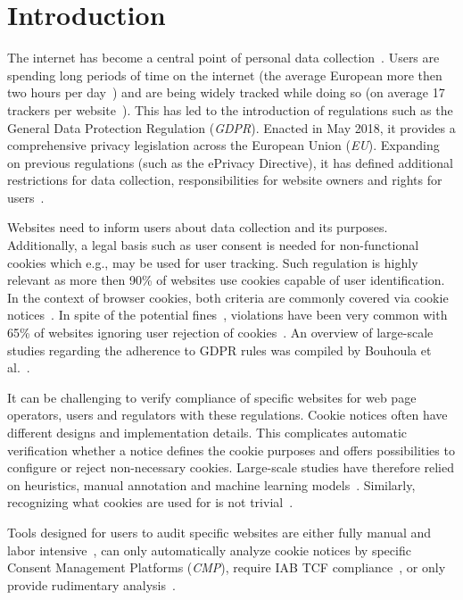 \chapter{Introduction} \label{chap:introduction}

The internet has become a central point of personal data collection~\cite{kretschmer2021cookie}.
Users are spending long periods of time on the internet (the average European more then two hours per day~\cite{kretschmer2021cookie}) and are being widely tracked while doing so (on average 17 trackers per website~\cite{kretschmer2021cookie}).
This has led to the introduction of regulations such as the General Data Protection Regulation (\emph{GDPR}). 
Enacted in May 2018, it provides a comprehensive privacy legislation across the European Union (\emph{EU}).
Expanding on previous regulations (such as the ePrivacy Directive), it has defined additional restrictions for data collection, responsibilities for website owners and rights for users~\cite{kretschmer2021cookie}.

Websites need to inform users about data collection and its purposes.
Additionally, a legal basis such as user consent is needed for non-functional cookies which e.g., may be used for user tracking.
Such regulation is highly relevant as more then 90\% of websites use cookies capable of user identification.
In the context of browser cookies, both criteria are commonly covered via cookie notices~\cite{bouhoula2023automated}.
In spite of the potential fines~\cite{sanchez_rola2019can}, violations have been very common with 65\% of websites ignoring user rejection of cookies~\cite{bouhoula2023automated}.
An overview of large-scale studies regarding the adherence to GDPR rules was compiled by Bouhoula et al.~\cite{bouhoula2023automated}.

It can be challenging to verify compliance of specific websites for web page operators, users and regulators with these regulations.
Cookie notices often have different designs and implementation details.
This complicates automatic verification whether a notice defines the cookie purposes and offers possibilities to configure or reject non-necessary cookies.
Large-scale studies have therefore relied on heuristics, manual annotation and machine learning models~\cite{kretschmer2021cookie, bouhoula2023automated}.
Similarly, recognizing what cookies are used for is not trivial~\cite{sanchez_rola2019can, bollinger2022automating}.

Tools designed for users to audit specific websites are either fully manual and labor intensive~\cite{gorin2024edpb}, can only automatically analyze cookie notices by specific Consent Management Platforms (\emph{CMP}), require IAB TCF compliance~\cite{matte2020cookiebannersrespectchoice}, or only provide rudimentary analysis~\cite{cookie_information2019cookie}.

